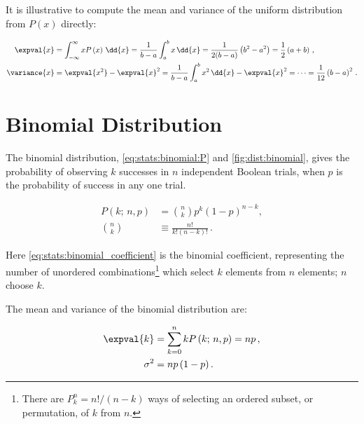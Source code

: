 It is illustrative to compute the mean and variance of the uniform distribution from $P(x)$ directly:

\begin{subequations}\label{eq:stats:uniform:mean_variance}
\begin{align}
\expval{x} &= \int_{-\infty}^{\infty} x P\left(x\right) \, \dd{x} = \frac{1}{b-a} \int_{a}^{b} x \, \dd{x} = \frac{1}{2(b-a)}\left(b^{2} - a^{2}\right) = \frac{1}{2}\left(a + b\right)\,, \label{eq:stats:uniform:mean_variance:mean} \\
\variance{x} &= \expval{x^{2}} - \expval{x}^{2} = \frac{1}{b-a} \int_{a}^{b} x^{2} \, \dd{x} - \expval{x}^{2} = \cdots = \frac{1}{12}\left(b-a\right)^{2}\,. \label{eq:stats:uniform:mean_variance:variance}
\end{align}
\end{subequations}

\section{Binomial Distribution}
\label{stats:binomial}

The binomial distribution, \cref{eq:stats:binomial:P} and \cref{fig:dist:binomial},
gives the probability of observing $k$ successes in $n$ independent Boolean trials,
when $p$ is the probability of success in any one trial.

\begin{subequations}\label{eq:stats:binomial}
\begin{align}
P\left(k;\,n,p\right) &= {n \choose k}p^{k} \left(1-p\right)^{n-k}, \label{eq:stats:binomial:P} \\
{n \choose k} &\equiv \frac{n!}{k!\left(n-k\right)!}\,. \label{eq:stats:binomial_coefficient}
\end{align}
\end{subequations}

\noindent Here \cref{eq:stats:binomial_coefficient} is the binomial coefficient,
representing the number of unordered combinations\footnote{There are
$P_{k}^{n} = n! / \left(n-k\right)$ ways of selecting an ordered subset,
or permutation, of $k$ from $n$.} which select $k$ elements from $n$ elements; $n$ choose $k$.

The mean and variance of the binomial distribution are:

\begin{subequations}\label{eq:stats:binomial:mean_variance}
\begin{align}
\expval{k} &= \sum_{k=0}^{n} k P\left(k;\,n,p\right) = n p\,, \label{eq:stats:binomial:mean} \\
\sigma^{2} &= n p\left(1-p\right). \label{eq:stats:binomial:variance}
\end{align}
\end{subequations}

